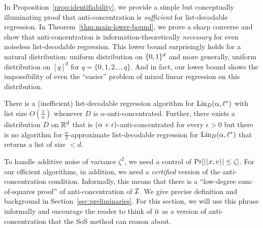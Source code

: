 In Proposition~\ref{prop:identifiability}, we provide a simple but conceptually illuminating proof that anti-concentration is \emph{sufficient} for list-decodable regression. In Theorem~\ref{thm:main-lower-bound}, we prove a sharp converse and show that anti-concentration is information-theoretically \emph{necessary} for even noiseless list-decodable regression. This lower bound surprisingly holds for a natural distribution: uniform distribution on $\{0,1\}^d$ and more generally, uniform distribution on $[q]^d$ for  $q = \{0,1,2\ldots,q\}$. And in fact, our lower bound shows the impossibility of even the ``easier'' problem of mixed linear regression on this distribution.

\begin{theorem}
There is a (inefficient) list-decodable regression algorithm for $\mathrm{Lin}_D(\alpha,\ell^*)$ with list size $O(\frac{1}{\alpha})$ whenever $D$ is $\alpha$-anti-concentrated. 
Further, there exists a distribution $D$ on $\mathbb R^d$ that is $(\alpha+\epsilon)$-anti-concentrated for every $\epsilon >0$ but there is no algorithm for $\frac{\alpha}{2}$-approximate list-decodable regression for $\mathrm{Lin}_D(\alpha,\ell^*)$  that returns a list of size $<d$. \label{thm:lower-bound-results}
\end{theorem}
To handle additive noise of variance $\zeta^2$, we need a control of $\Pr[ |\langle x,v\rangle| \leq \zeta]$. 
For our efficient algorithms, in addition, we need a \emph{certified} version of the anti-concentration condition. 
Informally, this means that there is a ``low-degree sum-of-squares proof'' of anti-concentration of $\mathcal I$.
We give precise definition and background in Section~\ref{sec:preliminaries}. For this section, we will use this phrase informally and encourage the reader to think of it as a version of anti-concentration that the SoS method can reason about.

